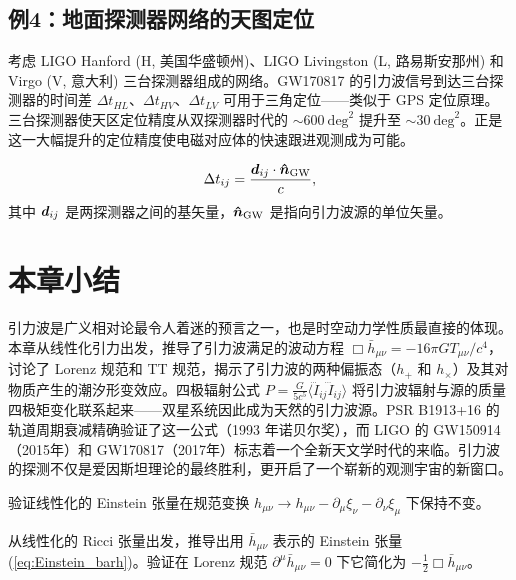 \subsection{例4：地面探测器网络的天图定位}

考虑 LIGO Hanford (H, 美国华盛顿州)、LIGO Livingston (L, 路易斯安那州) 和 Virgo (V, 意大利) 三台探测器组成的网络。GW170817 的引力波信号到达三台探测器的时间差 $\Delta t_{HL}$、$\Delta t_{HV}$、$\Delta t_{LV}$ 可用于三角定位——类似于 GPS 定位原理。三台探测器使天区定位精度从双探测器时代的 $\sim 600\ \text{deg}^2$ 提升至 $\sim 30\ \text{deg}^2$。正是这一大幅提升的定位精度使电磁对应体的快速跟进观测成为可能。

\begin{equation}
    \Delta t_{ij} = \frac{\vb*{d}_{ij} \cdot \vu*{n}_{\text{GW}}}{c},
\end{equation}
其中 $\vb*{d}_{ij}$ 是两探测器之间的基矢量，$\vu*{n}_{\text{GW}}$ 是指向引力波源的单位矢量。

\section*{本章小结}

引力波是广义相对论最令人着迷的预言之一，也是时空动力学性质最直接的体现。本章从线性化引力出发，推导了引力波满足的波动方程 $\Box\bar{h}_{\mu\nu} = -16\pi G T_{\mu\nu}/c^4$，讨论了 Lorenz 规范和 TT 规范，揭示了引力波的两种偏振态（$h_+$ 和 $h_\times$）及其对物质产生的潮汐形变效应。四极辐射公式 $P = \frac{G}{5c^5}\langle\dddot{I}_{ij}\dddot{I}_{ij}\rangle$ 将引力波辐射与源的质量四极矩变化联系起来——双星系统因此成为天然的引力波源。PSR B1913+16 的轨道周期衰减精确验证了这一公式（1993 年诺贝尔奖），而 LIGO 的 GW150914（2015年）和 GW170817（2017年）标志着一个全新天文学时代的来临。引力波的探测不仅是爱因斯坦理论的最终胜利，更开启了一个崭新的观测宇宙的新窗口。


\begin{exercise}
验证线性化的 Einstein 张量在规范变换 $h_{\mu\nu} \to h_{\mu\nu} - \partial_\mu\xi_\nu - \partial_\nu\xi_\mu$ 下保持不变。
\end{exercise}

\begin{exercise}
从线性化的 Ricci 张量出发，推导出用 $\bar{h}_{\mu\nu}$ 表示的 Einstein 张量 (\ref{eq:Einstein_barh})。验证在 Lorenz 规范 $\partial^\mu\bar{h}_{\mu\nu}=0$ 下它简化为 $-\frac{1}{2}\Box\bar{h}_{\mu\nu}$。
\end{exercise}

